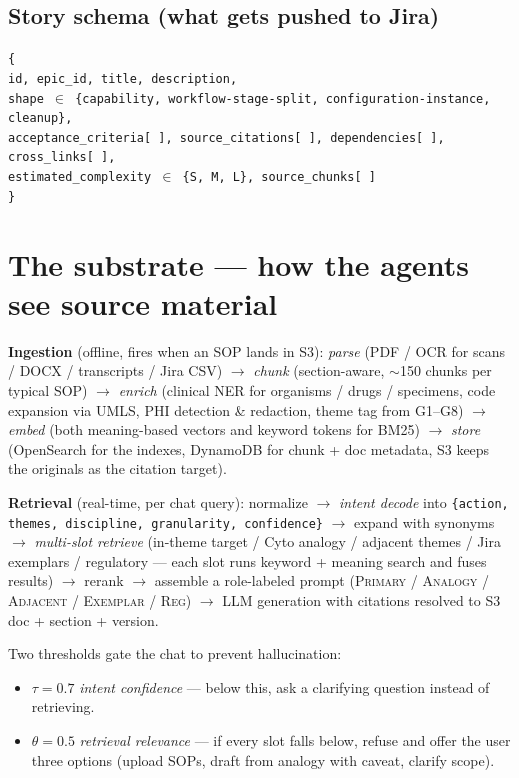 \documentclass[10.5pt,letterpaper]{article}
\begin{document}
\subsection{Story schema (what gets pushed to Jira)}

\noindent\texttt{\small \{\\
\hspace*{1em}id, epic\_id, title, description,\\
\hspace*{1em}shape $\in$ \{capability, workflow-stage-split, configuration-instance, cleanup\},\\
\hspace*{1em}acceptance\_criteria[\,], source\_citations[\,], dependencies[\,], cross\_links[\,],\\
\hspace*{1em}estimated\_complexity $\in$ \{S, M, L\}, source\_chunks[\,]\\
\}}

\section{The substrate --- how the agents see source material}

\textbf{Ingestion} (offline, fires when an SOP lands in S3): \emph{parse} (PDF / OCR for scans / DOCX / transcripts / Jira CSV) $\rightarrow$ \emph{chunk} (section-aware, $\sim$150 chunks per typical SOP) $\rightarrow$ \emph{enrich} (clinical NER for organisms / drugs / specimens, code expansion via UMLS, PHI detection \& redaction, theme tag from G1--G8) $\rightarrow$ \emph{embed} (both meaning-based vectors and keyword tokens for BM25) $\rightarrow$ \emph{store} (OpenSearch for the indexes, DynamoDB for chunk + doc metadata, S3 keeps the originals as the citation target).

\textbf{Retrieval} (real-time, per chat query): normalize $\rightarrow$ \emph{intent decode} into \texttt{\{action, themes, discipline, granularity, confidence\}} $\rightarrow$ expand with synonyms $\rightarrow$ \emph{multi-slot retrieve} (in-theme target / Cyto analogy / adjacent themes / Jira exemplars / regulatory --- each slot runs keyword + meaning search and fuses results) $\rightarrow$ rerank $\rightarrow$ assemble a role-labeled prompt (\textsc{Primary} / \textsc{Analogy} / \textsc{Adjacent} / \textsc{Exemplar} / \textsc{Reg}) $\rightarrow$ LLM generation with citations resolved to S3 doc + section + version.

Two thresholds gate the chat to prevent hallucination:
\begin{itemize}
  \item $\tau = 0.7$ \emph{intent confidence} --- below this, ask a clarifying question instead of retrieving.
  \item $\theta = 0.5$ \emph{retrieval relevance} --- if every slot falls below, refuse and offer the user three options (upload SOPs, draft from analogy with caveat, clarify scope).
\end{itemize}
\end{document}
